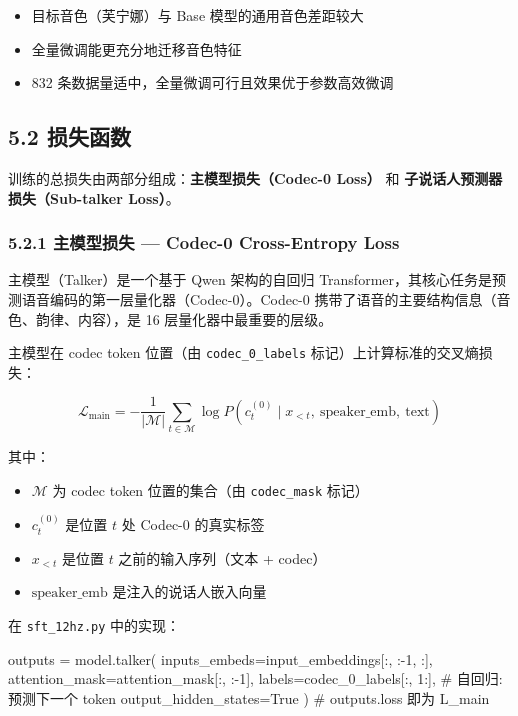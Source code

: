 \documentclass[
  english,
  letterpaper,
  DIV=11,
  numbers=noendperiod]{scrartcl}
\newenvironment{Shaded}{\begin{snugshade}}{\end{snugshade}}
\newcommand{\CommentTok}[1]{\textcolor[rgb]{0.37,0.37,0.37}{#1}}
\newcommand{\DecValTok}[1]{\textcolor[rgb]{0.68,0.00,0.00}{#1}}
\newcommand{\NormalTok}[1]{\textcolor[rgb]{0.00,0.23,0.31}{#1}}
\newcommand{\OperatorTok}[1]{\textcolor[rgb]{0.37,0.37,0.37}{#1}}
\newcommand{\VariableTok}[1]{\textcolor[rgb]{0.07,0.07,0.07}{#1}}
\providecommand{\tightlist}{%
  \setlength{\itemsep}{0pt}\setlength{\parskip}{0pt}}
\begin{document}
\begin{itemize}
\tightlist
\item
  目标音色（芙宁娜）与 Base 模型的通用音色差距较大
\item
  全量微调能更充分地迁移音色特征
\item
  832 条数据量适中，全量微调可行且效果优于参数高效微调
\end{itemize}

\subsection{5.2 损失函数}\label{ux635fux5931ux51fdux6570}

训练的总损失由两部分组成：\textbf{主模型损失（Codec-0 Loss）} 和
\textbf{子说话人预测器损失（Sub-talker Loss）}。

\subsubsection{5.2.1 主模型损失 --- Codec-0 Cross-Entropy
Loss}\label{ux4e3bux6a21ux578bux635fux5931-codec-0-cross-entropy-loss}

主模型（Talker）是一个基于 Qwen 架构的自回归
Transformer，其核心任务是预测语音编码的第一层量化器（Codec-0）。Codec-0
携带了语音的主要结构信息（音色、韵律、内容），是 16
层量化器中最重要的层级。

主模型在 codec token 位置（由 \texttt{codec\_0\_labels}
标记）上计算标准的交叉熵损失：

\[\mathcal{L}_{\text{main}} = -\frac{1}{|\mathcal{M}|} \sum_{t \in \mathcal{M}} \log P(c_t^{(0)} \mid x_{<t}, \ \text{speaker\_emb}, \ \text{text})\]

其中：

\begin{itemize}
\tightlist
\item
  \(\mathcal{M}\) 为 codec token 位置的集合（由 \texttt{codec\_mask}
  标记）
\item
  \(c_t^{(0)}\) 是位置 \(t\) 处 Codec-0 的真实标签
\item
  \(x_{<t}\) 是位置 \(t\) 之前的输入序列（文本 + codec）
\item
  \(\text{speaker\_emb}\) 是注入的说话人嵌入向量
\end{itemize}

在 \texttt{sft\_12hz.py} 中的实现：

\begin{Shaded}
\begin{Highlighting}[]
\NormalTok{outputs }\OperatorTok{=}\NormalTok{ model.talker(}
\NormalTok{    inputs\_embeds}\OperatorTok{=}\NormalTok{input\_embeddings[:, :}\OperatorTok{{-}}\DecValTok{1}\NormalTok{, :],}
\NormalTok{    attention\_mask}\OperatorTok{=}\NormalTok{attention\_mask[:, :}\OperatorTok{{-}}\DecValTok{1}\NormalTok{],}
\NormalTok{    labels}\OperatorTok{=}\NormalTok{codec\_0\_labels[:, }\DecValTok{1}\NormalTok{:],    }\CommentTok{\# 自回归: 预测下一个 token}
\NormalTok{    output\_hidden\_states}\OperatorTok{=}\VariableTok{True}
\NormalTok{)}
\CommentTok{\# outputs.loss 即为 L\_main}
\end{Highlighting}
\end{Shaded}
\end{document}

